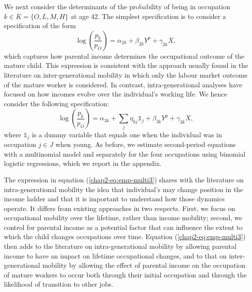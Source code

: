 We next consider the determinants of the probability of being in occupation $k \in K = \{O, L , M, H\}$ at age 42. The simplest specification is to consider a specification of the form
\begin{equation}\label{chap2-eq:emp-multi2}
    \log\left(\frac{p_k}{p_O}\right) = \alpha_{2k} + \beta_{2k} Y^p + \gamma_{2k} X,
\end{equation}
which captures how parental income determines the occupational outcome of the mature child. This expression is consistent with the approach usually found in the literature on inter-generational mobility in which only the labour market outcome of the mature worker is considered. In contrast, intra-generational analyses have focused on how incomes evolve over the individual's working life. We hence consider the following specification: 
\begin{equation}\label{chap2-eq:emp-multi3}
    \log\left(\frac{p_k}{p_O}\right) = \alpha_{3k} + \sum_{j} \eta_{kj} \mathbb{1}_{j} + \beta_{3k} Y^p + \gamma_{3k} X,
\end{equation}
where $\mathbb{1}_{j}$ is a dummy variable that equals one when the individual was in occupation $j\in J$ when young. As before, we estimate second-period equations with a multinomial model and separately for the four occupations using binomial logistic regressions, which we report in the appendix.

The expression in equation (\ref{chap2-eq:emp-multi3}) shares with the literature on intra-generational mobility the idea that individual's may change position in the income ladder and that it is important to understand how those dynamics operate. It differs from existing approaches in two respects. First, we focus on occupational mobility over the lifetime, rather than income mobility; second, we control for parental income as a potential factor that can influence the extent to which the child changes occupations over time. Equation (\ref{chap2-eq:emp-multi3}) then adds to the literature on intra-generational mobility by allowing parental income to have an impact on lifetime occupational changes, and to that on inter-generational mobility by allowing the effect of parental income on the occupation of mature workers to occur both through their initial occupation and through the likelihood of transition to other jobs.  


